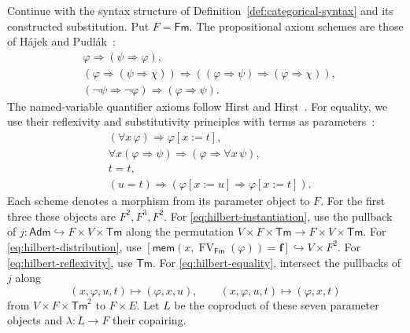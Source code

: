 \documentclass[11pt]{article}
\theoremstyle{definition}\newtheorem{definition}[theorem]{Definition}
\newcommand{\Tm}{\mathsf{Tm}}
\newcommand{\Fm}{\mathsf{Fm}}
\newcommand{\FV}{\operatorname{FV}}
\newcommand{\Adm}{\mathsf{Adm}}
\newcommand{\mem}{\mathsf{mem}}
\begin{document}
Continue with the syntax structure of
Definition~\ref{def:categorical-syntax} and its constructed substitution.
Put $F=\Fm$. The propositional axiom schemes are those of
H\'ajek and Pudl\'ak~\cite[0.10, p.~7]{HP}:
\begin{align}
 &\varphi\Rightarrow(\psi\Rightarrow\varphi),
                                                        \label{eq:hilbert-one}\\
 &(\varphi\Rightarrow(\psi\Rightarrow\chi))
   \Rightarrow((\varphi\Rightarrow\psi)
   \Rightarrow(\varphi\Rightarrow\chi)),
                                                        \label{eq:hilbert-two}\\
 &(\neg\psi\Rightarrow\neg\varphi)
   \Rightarrow(\varphi\Rightarrow\psi).
                                                        \label{eq:hilbert-three}
\end{align}
The named-variable quantifier axioms follow
Hirst and Hirst~\cite[Sections 2.11--2.12]{HH}. For equality, we use
their reflexivity and substitutivity principles with terms as
parameters~\cite[Section 3.1]{HH}:
\begin{align}
 &(\forall x\,\varphi)\Rightarrow\varphi[x:=t],
                                                        \label{eq:hilbert-instantiation}\\
 &\forall x(\varphi\Rightarrow\psi)
       \Rightarrow(\varphi\Rightarrow\forall x\,\psi),
                                                        \label{eq:hilbert-distribution}\\
 &t=t,                                                   \label{eq:hilbert-reflexivity}\\
 &(u=t)\Rightarrow
       (\varphi[x:=u]\Rightarrow\varphi[x:=t]).           \label{eq:hilbert-equality}
\end{align}
Each scheme denotes a morphism from its parameter object to $F$.
For the first three these objects are $F^2,F^3,F^2$.
For \eqref{eq:hilbert-instantiation}, use the pullback of
$j:\Adm\hookrightarrow F\times V\times\Tm$ along the
permutation $V\times F\times\Tm\to F\times V\times\Tm$.
For \eqref{eq:hilbert-distribution}, use
$[\mem(x,\FV_{\Fm}(\varphi))=\mathbf{f}]
\hookrightarrow V\times F^2$.
For \eqref{eq:hilbert-reflexivity}, use $\Tm$.
For \eqref{eq:hilbert-equality}, intersect the pullbacks of $j$
along
\[
 (x,\varphi,u,t)\longmapsto(\varphi,x,u),\qquad
 (x,\varphi,u,t)\longmapsto(\varphi,x,t)
\]
from $V\times F\times\Tm^2$ to $F\times E$.
Let $L$ be the coproduct of these seven parameter objects and
$\lambda:L\to F$ their copairing.
\end{document}
